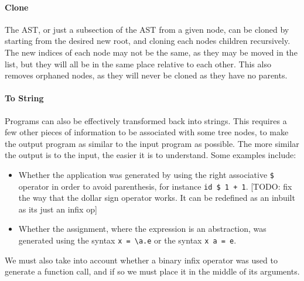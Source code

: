 \paragraph{Clone} The AST, or just a subsection of the AST from a given node, can be cloned by starting from the desired new root, and cloning each nodes children recursively. The new indices of each node may not be the same, as they may be moved in the list, but they will all be in the same place relative to each other. This also removes orphaned nodes, as they will never be cloned as they have no parents. 

\paragraph{To String} \label{paragraph:to_string} Programs can also be effectively transformed back into strings. This requires a few other pieces of information to be associated with some tree nodes, to make the output program as similar to the input program as possible. The more similar the output is to the input, the easier it is to understand. Some examples include:
\begin{itemize}
    \item Whether the application was generated by using the right associative \verb|$| operator in order to avoid parenthesis, for instance \verb|id $ 1 + 1|. [TODO: fix the way that the dollar sign operator works. It can be redefined as an inbuilt as its just an infix op]
    \item Whether the assignment, where the expression is an abstraction, was generated using the syntax \verb|x = \a.e| or the syntax \verb|x a = e|. 
\end{itemize}
We must also take into account whether a binary infix operator was used to generate a function call, and if so we must place it in the middle of its arguments. 


